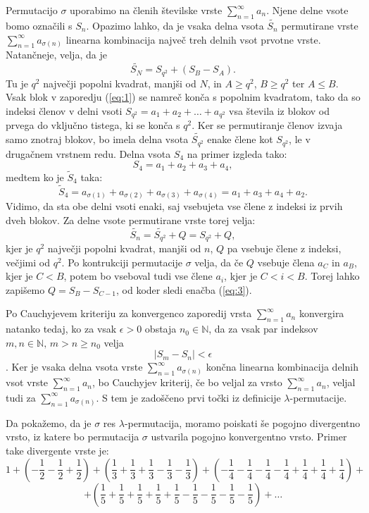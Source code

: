 \documentclass[12pt,a4paper,reqno]{amsart}
\theoremstyle{definition} %
\theoremstyle{plain} %
\newcommand{\N}{\mathbb N}
\begin{document}
Permutacijo $\sigma$ uporabimo na členih številske vrste $\sum^{\infty}_{n=1}a_n$. Njene delne vsote bomo označili s $S_n$. Opazimo lahko, da je vsaka delna vsota $\tilde{S_n}$ permutirane vrste $\sum^{\infty}_{n=1}a_{\sigma(n)}$ linearna kombinacija največ treh delnih vsot prvotne vrste. Natančneje, velja, da je 
\begin{equation}
\tilde{S_N}=S_{q^2}+(S_B-S_A).\label{eq:3} 
\end{equation}
Tu je $q^2$ največji popolni kvadrat, manjši od $N$, in $A \geq q^2$, $B \geq q^2$ ter $A \leq B$. Vsak blok v zaporedju (\ref{eq:1}) se namreč konča s popolnim kvadratom, tako da so indeksi členov v delni vsoti $S_{q^2}=a_1+a_2+\ldots+a_{q^2}$ vsa števila iz blokov od prvega do vključno tistega, ki se konča s $q^2$. Ker se permutiranje členov izvaja samo znotraj blokov, bo imela delna vsota $\tilde{S_{q^2}}$ enake člene kot $S_{q^2}$, le v drugačnem vrstnem redu. 
Delna vsota $S_4$ na primer izgleda tako: $$S_4 = a_1+a_2+a_3+a_4,$$ medtem ko je $\tilde{S}_4$ taka: $$\tilde{S}_4=a_{\sigma(1)}+a_{\sigma(2)}+a_{\sigma(3)}+a_{\sigma(4)}=a_1+a_3+a_4+a_2.$$ Vidimo, da sta obe delni vsoti enaki, saj vsebujeta vse člene z indeksi iz prvih dveh blokov. Za delne vsote  permutirane vrste torej velja: $$\tilde{S_n}=\tilde{S_{q^2}}+Q=S_{q^2}+Q,$$ kjer je $q^2$ največji popolni kvadrat, manjši od $n$, $Q$ pa vsebuje člene z indeksi, večjimi od $q^2$. Po kontrukciji permutacije $\sigma$ velja, da če $Q$ vsebuje člena $a_C$ in $a_B$, kjer je $C < B$, potem bo vseboval tudi vse člene $a_i$, kjer je $C<i<B$. Torej lahko zapišemo $Q=S_B-S_{C-1}$, od koder sledi enačba (\ref{eq:3}).

Po Cauchyjevem kriteriju za konvergenco zaporedij vrsta $\sum^{\infty}_{n=1}a_n$ konvergira natanko tedaj, ko za vsak $\epsilon >0$ obstaja $n_0 \in \N$, da za vsak par indeksov $m,n\in \N \textrm{, }m>n\geq n_0$ velja $$|S_m-S_n|<\epsilon$$. Ker je vsaka delna vsota vrste $\sum^{\infty}_{n=1}a_{\sigma(n)}$ končna linearna kombinacija delnih vsot vrste $\sum^{\infty}_{n=1}a_{n}$, bo Cauchyjev kriterij, če bo veljal za vrsto $\sum^{\infty}_{n=1}a_{n}$, veljal tudi za $\sum^{\infty}_{n=1}a_{\sigma(n)}$. S tem je zadoščeno prvi točki iz definicije $\lambda$-permutacije. %

Da pokažemo, da je $\sigma$ res $\lambda$-permutacija, moramo poiskati še pogojno divergentno vrsto, iz katere bo permutacija $\sigma$ ustvarila pogojno konvergentno vrsto. Primer take divergente vrste je:
$$1+\left (-\frac{1}{2}-\frac{1}{2}+\frac{1}{2}\right )+\left (\frac{1}{3}+\frac{1}{3}+\frac{1}{3}-\frac{1}{3}-\frac{1}{3} \right )+\left (-\frac{1}{4}-\frac{1}{4}-\frac{1}{4}-\frac{1}{4}+\frac{1}{4}+\frac{1}{4}+\frac{1}{4}\right )+$$ $$+\left (\frac{1}{5}+\frac{1}{5}+\frac{1}{5}+\frac{1}{5}+\frac{1}{5}-\frac{1}{5}-\frac{1}{5}-\frac{1}{5}-\frac{1}{5} \right )+\dots $$
\end{document}

